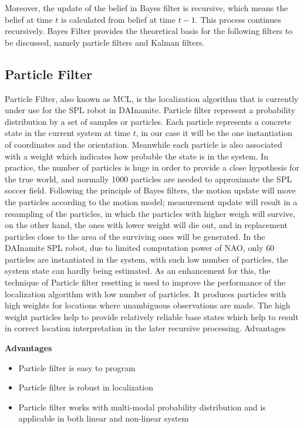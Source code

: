 Moreover, the update of the belief in Bayes filter is recursive, which means the belief at time $t$ is calculated from belief at time $t-1$. This process continues recursively. Bayes Filter provides the theoretical basis for the following filters to be discussed, namely particle filters and Kalman filters. 

\subsection{Particle Filter}
Particle Filter, also known as \gls{MCL}, is the localization algorithm that is currently under use for the \gls{SPL} robot in DAInamite. Particle filter represent a probability distribution by a set of samples or particles. Each particle represents a concrete state in the current system at time $t$, in our case it will be the one instantiation of coordinates and the orientation. Meanwhile each particle is also associated with a weight which indicates how probable the state is in the system. In practice, the number of particles is huge in order to provide a close hypothesis for the true world, and normally 1000 particles are needed to approximate the \gls{SPL} soccer field. Following the principle of Bayes filters, the motion update will move the particles according to the motion model; measurement update will result in a resampling of the particles, in which the particles with higher weigh will survive, on the other hand, the ones with lower weight will die out, and in replacement particles close to the area of the surviving ones will be generated. In the DAInamite \gls{SPL} robot, due to limited computation power of NAO, only 60 particles are instantiated in the system, with such low number of particles, the system state can hardly being estimated. As an enhancement for this, the technique of Particle filter resetting is used to improve the performance of the localization algorithm with low number of particles. It produces particles with high weights for locations where unambiguous observations are made. The high weight particles help to provide relatively reliable base states which help to result in correct location interpretation in the later recursive processing. 
Advantages

\noindent\textbf{Advantages}
\begin{itemize}
  \item  Particle filter is easy to program
  \item Particle filter is robust in localization 
  \item  Particle filter works with multi-modal probability distribution and is applicable in both linear and non-linear system
\end{itemize}

